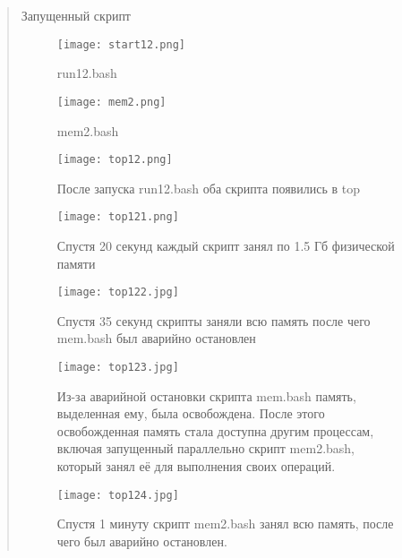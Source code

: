 \documentclass[12pt]{article}
\begin{document}
\begin{quote}
\begin{center}
    \normalsize Запущенный скрипт
\end{center}

\begin{figure}[h]
    \centering
    \texttt{[image: start12.png]}
    \caption{run12.bash}
    \label{fig:example}
\end{figure}

\begin{figure}[h]
    \centering
    \texttt{[image: mem2.png]}
    \caption{mem2.bash}
    \label{fig:example}
\end{figure}

\begin{figure}[h]
    \centering
    \texttt{[image: top12.png]}
    \caption{После запуска run12.bash оба скрипта появились в top}
    \label{fig:example}
\end{figure}

\begin{figure}[h]
    \centering
    \texttt{[image: top121.png]}
    \caption{Спустя 20 секунд каждый скрипт занял по 1.5 Гб физической памяти}
    \label{fig:example}
\end{figure}

\begin{figure}[h]
    \centering
    \texttt{[image: top122.jpg]}
    \caption{Спустя 35 секунд скрипты заняли всю память после чего mem.bash был аварийно остановлен}
    \label{fig:example}
\end{figure}

\begin{figure}[h]
    \centering
    \texttt{[image: top123.jpg]}
    \caption{Из-за аварийной остановки скрипта mem.bash память, выделенная ему, была освобождена. После этого освобожденная память стала доступна другим процессам, включая запущенный параллельно скрипт mem2.bash, который занял её для выполнения своих операций.}
    \label{fig:example}
\end{figure}

\begin{figure}[h]
    \centering
    \texttt{[image: top124.jpg]}
    \caption{Спустя 1 минуту скрипт mem2.bash занял всю память, после чего был аварийно остановлен.}
    \label{fig:example}
\end{figure}

\clearpage


\end{quote}
\end{document}

